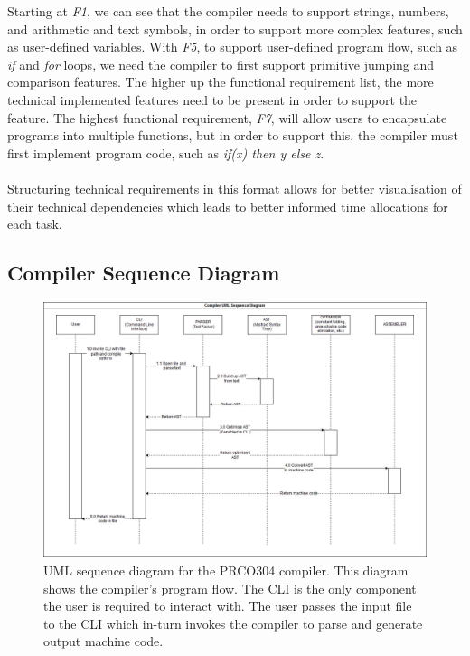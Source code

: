 \documentclass[11pt,a4paper]{report}
\newcommand{\scname}{PRCO304}
\begin{document}
\scriptsize
Starting at \textit{F1}, we can see that the compiler needs to support strings, numbers, and arithmetic and text symbols, in order to support more complex features, such as user-defined variables. With \textit{F5}, to support user-defined program flow, such as \textit{if} and \textit{for} loops, we need the compiler to first support primitive jumping and comparison features. The higher up the functional requirement list, the more technical implemented features need to be present in order to support the feature. The highest functional requirement, \textit{F7}, will allow users to encapsulate programs into multiple functions, but in order to support this, the compiler must first implement program code, such as \textit{if(x) then y else z}.\\\\Structuring technical requirements in this format allows for better visualisation of their technical dependencies which leads to better informed time allocations for each task.
\normalsize

\subsection{Compiler Sequence Diagram}
\label{sect:compiler_seq_uml}
\begin{figure}[H]
\begin{center}
\includegraphics[scale=0.4]{fig_compiler_uml_seq}
\end{center}
\caption{UML sequence diagram for the \scname{} compiler. This diagram shows the compiler's program flow. The CLI is the only component the user is required to interact with. The user passes the input file to the CLI which in-turn invokes the compiler to parse and generate output machine code.}
\label{fig:hld}
\end{figure}
\end{document}
